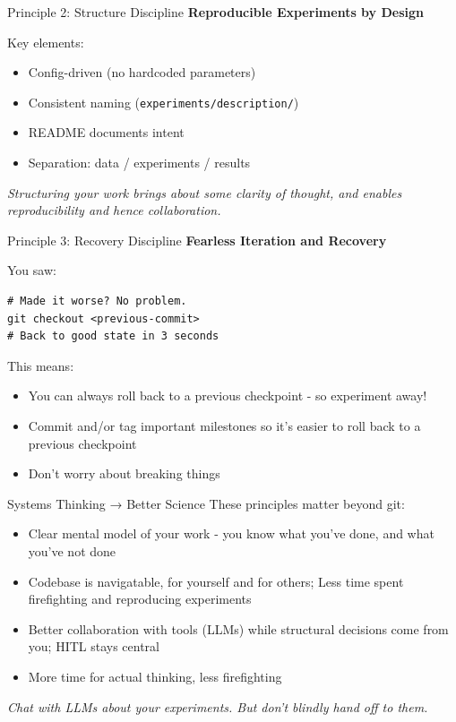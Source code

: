 \documentclass{beamer}
\begin{document}
\begin{frame}{Principle 2: Structure Discipline}
\textbf{Reproducible Experiments by Design}

\vspace{1em}
Key elements:
\begin{itemize}
    \item Config-driven (no hardcoded parameters)
    \item Consistent naming (\texttt{experiments/description/})
    \item README documents intent
    \item Separation: data / experiments / results
\end{itemize}

\vspace{1em}
\textit{Structuring your work brings about some clarity of thought, and enables reproducibility and hence collaboration.}
\end{frame}

\begin{frame}[fragile]{Principle 3: Recovery Discipline}
\textbf{Fearless Iteration and Recovery}

\vspace{1em}
You saw:
\begin{lstlisting}
# Made it worse? No problem.
git checkout <previous-commit>
# Back to good state in 3 seconds
\end{lstlisting}

\vspace{1em}
This means:
\begin{itemize}
    \item You can always roll back to a previous checkpoint - so experiment away!
    \item Commit and/or tag important milestones so it's easier to roll back to a previous checkpoint
    \item Don't worry about breaking things
\end{itemize}
\end{frame}

\begin{frame}{Systems Thinking → Better Science}
\Large
These principles matter beyond git:

\vspace{1em}
\normalsize
\begin{itemize}
    \item Clear mental model of your work - you know what you've done, and what you've not done
    \item Codebase is navigatable, for yourself and for others; Less time spent firefighting and reproducing experiments
    \item Better collaboration with tools (LLMs) while structural decisions come from you; HITL stays central
    \item More time for actual thinking, less firefighting
\end{itemize}

\vspace{1em}
\textit{Chat with LLMs about your experiments. But don't blindly hand off to them.}
\end{frame}
\end{document}
